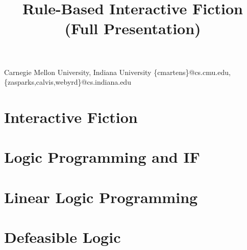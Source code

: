 \documentclass[computermodern,nocopyrightspace]{sigplanconf}
\begin{document}
%

\title{Rule-Based Interactive Fiction (Full Presentation)}


           {Carnegie Mellon University, Indiana University}
           {\{cmartens\}@cs.cmu.edu,\{zasparks,calvis,webyrd\}@cs.indiana.edu}

\maketitle

\section{Interactive Fiction}



\section{Logic Programming and IF}



\section{Linear Logic Programming}



\section{Defeasible Logic}



\acks



\nocite{Covington:1996:PPD:230996}
\nocite{apt03principles}
\nocite{Marriottp98Pwc}
\nocite{trs2005}
\nocite{zarfrulespage}




\end{document}
